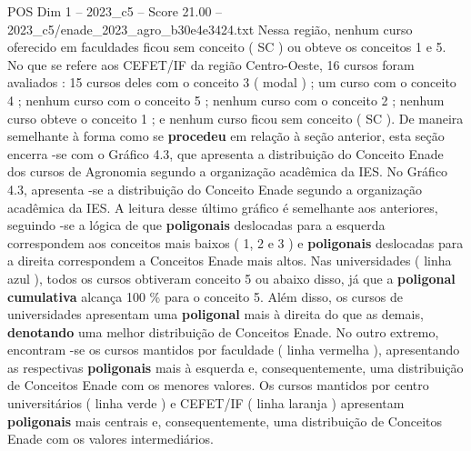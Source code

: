 \begin{textsample}{POS Dim 1 – 2023\_c5 – Score 21.00 – 2023\_c5/enade\_2023\_agro\_b30e4e3424.txt}
Nessa região, nenhum curso oferecido em faculdades ficou sem conceito ( SC ) ou obteve os conceitos 1 e 5.
No que se refere aos CEFET/IF da região Centro-Oeste, 16 cursos foram avaliados : 15 cursos deles com o conceito 3 ( modal ) ; um curso com o conceito 4 ; nenhum curso com o conceito 5 ; nenhum curso com o conceito 2 ; nenhum curso obteve o conceito 1 ; e nenhum curso ficou sem conceito ( SC ).
De maneira semelhante à forma como se \textbf{procedeu} em relação à seção anterior, esta seção encerra -se com o Gráfico 4.3, que apresenta a distribuição do Conceito Enade dos cursos de Agronomia segundo a organização acadêmica da IES.
No Gráfico 4.3, apresenta -se a distribuição do Conceito Enade segundo a organização acadêmica da IES.
A leitura desse último gráfico é semelhante aos anteriores, seguindo -se a lógica de que \textbf{poligonais} deslocadas para a esquerda correspondem aos conceitos mais baixos ( 1, 2 e 3 ) e \textbf{poligonais} deslocadas para a direita correspondem a Conceitos Enade mais altos.
Nas universidades ( linha azul ), todos os cursos obtiveram conceito 5 ou abaixo disso, já que a \textbf{poligonal} \textbf{cumulativa} alcança 100 \% para o conceito 5.
Além disso, os cursos de universidades apresentam uma \textbf{poligonal} mais à direita do que as demais, \textbf{denotando} uma melhor distribuição de Conceitos Enade.
No outro extremo, encontram -se os cursos mantidos por faculdade ( linha vermelha ), apresentando as respectivas \textbf{poligonais} mais à esquerda e, consequentemente, uma distribuição de Conceitos Enade com os menores valores.
Os cursos mantidos por centro universitários ( linha verde ) e CEFET/IF ( linha laranja ) apresentam \textbf{poligonais} mais centrais e, consequentemente, uma distribuição de Conceitos Enade com os valores intermediários.

\end{textsample}
